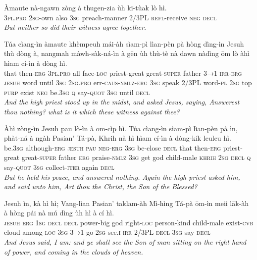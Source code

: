 \documentclass[11pt,a4paper]{article}
\begin{document}
\begin{exe}
\gll Àmaute nà-ngawn zòng à thugen-zia ùh kī-tùak lò hì. \\
     \textsc{3pl}.\textsc{pro} \textsc{2sg}-own also \textsc{3sg} preach-manner 2/3PL \textsc{refl}-receive \textsc{neg} \textsc{decl} \\
\glt \textcolor{kjvcolor}{\textit{But neither so did their witness agree together.}}

\gll Túa cìang-ìn àmaute khèmpeuh mái-àh sìam-pì lìan-pèn pà hòng dìng-ìn Jesuh thù dòng à, nangmah màwh-sàk-ná-ìn à gēn ùh thù-tè nà dawn nàdìng ōm lò àhì hìam cí-ìn à dòng hì. \\
     that then-\textsc{erg} \textsc{3pl}.\textsc{pro} all face-\textsc{loc} priest-great great-\textsc{super} father \textsc{3→1} \textsc{irr}-\textsc{erg} \textsc{jesuh} word until \textsc{3sg} \textsc{2sg}.\textsc{pro} err-\textsc{caus}-\textsc{nmlz}-\textsc{erg} \textsc{3sg} speak 2/3PL word-\textsc{pl} \textsc{2sg} top \textsc{purp} exist \textsc{neg} be.\textsc{3sg} \textsc{q} say-\textsc{quot} \textsc{3sg} until \textsc{decl} \\
\glt \textcolor{kjvcolor}{\textit{And the high priest stood up in the midst, and asked Jesus, saying, Answerest thou nothing? what is it which these witness against thee?}}

\gll Àhì zòng-ìn Jesuh pau lò-ìn à om-cìp hì. Túa cìang-ìn sìam-pì lìan-pèn pà ìn, phàt-ná à ngàh Pasian' Tá-pà, Khrih nà hì hìam cí-ìn à dòng-kík leuleu hì. \\
     be.\textsc{3sg} although-\textsc{erg} \textsc{jesuh} \textsc{pau} \textsc{neg}-\textsc{erg} \textsc{3sg} be-close \textsc{decl} that then-\textsc{erg} priest-great great-\textsc{super} father \textsc{erg} praise-\textsc{nmlz} \textsc{3sg} get god child-male \textsc{khrih} \textsc{2sg} \textsc{decl} \textsc{q} say-\textsc{quot} \textsc{3sg} collect-\textsc{iter} again \textsc{decl} \\
\glt \textcolor{kjvcolor}{\textit{But he held his peace, and answered nothing. Again the high priest asked him, and said unto him, Art thou the Christ, the Son of the Blessed?}}

\gll Jesuh ìn, kà hì hì; Vang-lìan Pasian' taklam-àh Mì-hìng Tá-pà ōm-ìn meii lāk-àh à hòng pái nà mú dìng ùh hì à cí hì. \\
     \textsc{jesuh} \textsc{erg} \textsc{1sg} \textsc{decl} \textsc{decl} power-big god right-\textsc{loc} person-kind child-male exist-\textsc{cvb} cloud among-\textsc{loc} \textsc{3sg} \textsc{3→1} go \textsc{2sg} see.\textsc{i} \textsc{irr} 2/3PL \textsc{decl} \textsc{3sg} say \textsc{decl} \\
\glt \textcolor{kjvcolor}{\textit{And Jesus said, I am: and ye shall see the Son of man sitting on the right hand of power, and coming in the clouds of heaven.}}


\end{exe}
\end{document}
